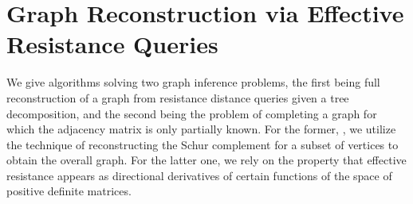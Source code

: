 \section{Graph Reconstruction via Effective Resistance Queries}
\label{sec:reconstruction}
We give algorithms solving two graph inference problems, the first being full reconstruction of a graph from resistance distance queries given a tree decomposition, and the second being the problem of completing a graph for which the adjacency matrix is only partially known.
For the former, 
,
we utilize the technique of reconstructing the Schur complement for a subset of vertices to obtain the overall graph. For the latter one, we rely on the property that effective resistance appears as directional derivatives of certain functions of the space of positive definite matrices.


